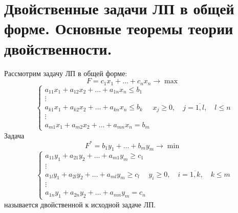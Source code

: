 \documentclass[17pt]{extarticle}
\begin{document}
\section{Двойственные задачи ЛП в общей форме. Основные теоремы теории двойственности.}

\begin{definition}
    Рассмотрим задачу ЛП в общей форме:
    \[
        F = c_1 x_1 + \ldots + c_n x_n \rightarrow \max
    \]
    \[
        \begin{cases}
            a_{11} x_1 + a_{12} x_2 + \ldots + a_{1n} x_n \leq b_1 \\
            \vdots                                                 \\
            a_{k1} x_1 + a_{k2} x_2 + \ldots + a_{kn} x_n \leq b_k \\
            \vdots                                                 \\
            a_{m1} x_1 + a_{m2} x_2 + \ldots + a_{mn} x_n = b_m
        \end{cases} x_j \geq 0, \quad j = \overline{1, l}, \quad l \leq n
    \]
    Задача
    \[
        F^* = b_1 y_1 + \ldots + b_m y_m \rightarrow \min
    \]
    \[
        \begin{cases}
            a_{11} y_1 + a_{21} y_2 + \ldots + a_{m1} y_m \geq c_1 \\
            \vdots                                                 \\
            a_{1l} y_1 + a_{2l} y_2 + \ldots + a_{ml} y_m \geq c_l \\
            \vdots                                                 \\
            a_{1n} y_1 + a_{2n} y_2 + \ldots + a_{mn} y_m = c_n
        \end{cases} y_i \geq 0, \quad i = \overline{1, k}, \quad k \leq m
    \]
    называется двойственной к исходной задаче ЛП.
\end{definition}
\end{document}
